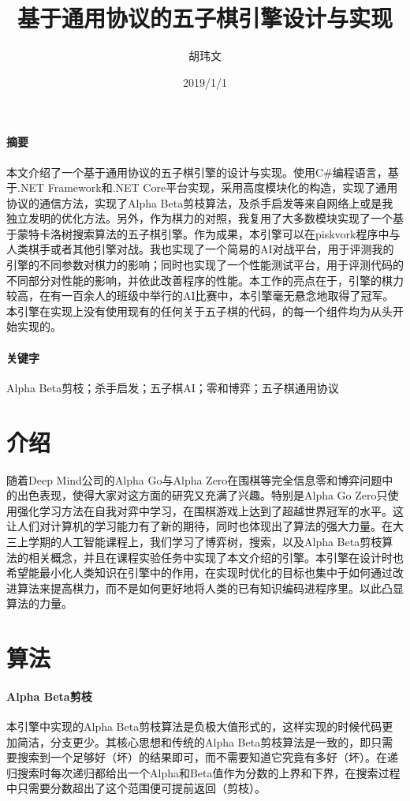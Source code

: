 \documentclass{article}
\title{基于通用协议的五子棋引擎设计与实现}
\author{胡玮文}
\date{2019/1/1}
\begin{document}
\maketitle
\newpage

\paragraph{摘要} 本文介绍了一个基于通用协议的五子棋引擎的设计与实现。使用C\#编程语言，基于.NET Framework和.NET Core平台实现，采用高度模块化的构造，实现了通用协议的通信方法，实现了Alpha Beta剪枝算法，及杀手启发等来自网络上或是我独立发明的优化方法。另外，作为棋力的对照，我复用了大多数模块实现了一个基于蒙特卡洛树搜索算法的五子棋引擎。作为成果，本引擎可以在piskvork程序中与人类棋手或者其他引擎对战。我也实现了一个简易的AI对战平台，用于评测我的引擎的不同参数对棋力的影响；同时也实现了一个性能测试平台，用于评测代码的不同部分对性能的影响，并依此改善程序的性能。本工作的亮点在于，引擎的棋力较高，在有一百余人的班级中举行的AI比赛中，本引擎毫无悬念地取得了冠军。本引擎在实现上没有使用现有的任何关于五子棋的代码，的每一个组件均为从头开始实现的。

\paragraph{关键字} Alpha Beta剪枝；杀手启发；五子棋AI；零和博弈；五子棋通用协议

\section{介绍}
随着Deep Mind公司的Alpha Go与Alpha Zero在围棋等完全信息零和博弈问题中的出色表现，使得大家对这方面的研究又充满了兴趣。特别是Alpha Go Zero只使用强化学习方法在自我对弈中学习，在围棋游戏上达到了超越世界冠军的水平。这让人们对计算机的学习能力有了新的期待，同时也体现出了算法的强大力量。在大三上学期的人工智能课程上，我们学习了博弈树，搜索，以及Alpha Beta剪枝算法的相关概念，并且在课程实验任务中实现了本文介绍的引擎。本引擎在设计时也希望能最小化人类知识在引擎中的作用，在实现时优化的目标也集中于如何通过改进算法来提高棋力，而不是如何更好地将人类的已有知识编码进程序里。以此凸显算法的力量。

\section{算法}

\paragraph{Alpha Beta剪枝} 本引擎中实现的Alpha Beta剪枝算法是负极大值形式的，这样实现的时候代码更加简洁，分支更少。其核心思想和传统的Alpha Beta剪枝算法是一致的，即只需要搜索到一个足够好（坏）的结果即可，而不需要知道它究竟有多好（坏）。在递归搜索时每次递归都给出一个Alpha和Beta值作为分数的上界和下界，在搜索过程中只需要分数超出了这个范围便可提前返回（剪枝）。
\end{document}
